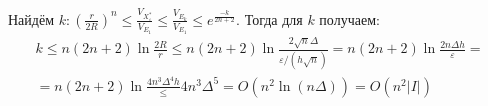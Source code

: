 \documentclass[11pt]{article}
\begin{document}
Найдём $k: \left(\frac{r}{2R}\right)^n \leq \frac{V_{X^*_{\varepsilon}}}{V_{E_1}} \leq \frac{V_{E_k}}{V_{E_1}} \leq e^{\frac{-k}{2n + 2}}$.
Тогда для $k$ получаем:
\begin{multline}
k \leq n(2n + 2)\ln\frac{2R}{r} \leq n(2n + 2)\ln\frac{2\sqrt{n}\Delta}{\varepsilon/(h\sqrt{n})} =
n(2n + 2)\ln\frac{2n\Delta h}{\varepsilon} = \\
= n(2n + 2)\ln\frac{4n^3\Delta^4h} \leq 4n^3\Delta^5
= O(n^2\ln(n\Delta)) = O(n^2|I|)
\end{multline}
\end{document}
